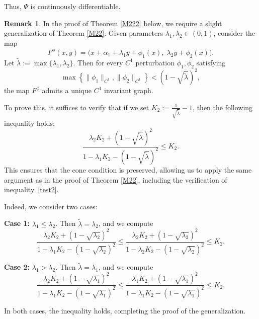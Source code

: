 \documentclass{amsart}
\theoremstyle{definition}
\newtheorem{Remark}[Definition]{Remark}
\begin{document}
Thus, $\Psi$ is continuously differentiable.

\begin{Remark}\label{needb}
In the proof of Theorem \ref{M222} below, we require a slight generalization of Theorem \ref{M22}. Given parameters $\lambda_1, \lambda_2 \in (0,1)$, consider the map
\begin{equation}\label{Fpwp}
F^\phi(x,y) = \big(x + \alpha_1 + \lambda_1 y + \phi_1(x),\; \lambda_2 y + \phi_2(x)\big).
\end{equation}
Let $\tilde{\lambda} := \max\{\lambda_1, \lambda_2\}$. Then for every $C^1$ perturbation $\phi_1, \phi_2$ satisfying
\[
\max\left\{\|\phi_1\|_{C^1},\|\phi_2\|_{C^1}\right\} < (1 - \sqrt{\tilde{\lambda}})^2,
\]
the map $F^\phi$ admits a unique $C^1$ invariant graph.

To prove this, it suffices to verify that if we set $K_2 := \frac{1}{\sqrt{\tilde{\lambda}}} - 1$, then the following inequality holds:
\[
\frac{\lambda_2 K_2 + (1 - \sqrt{\tilde{\lambda}})^2}{1 - \lambda_1 K_2 - (1 - \sqrt{\tilde{\lambda}})^2} \leq K_2.
\]
This ensures that the cone condition is preserved, allowing us to apply the same argument as in the proof of Theorem \ref{M22}, including the verification of inequality~\eqref{test2}.

Indeed, we consider two cases:

\medskip
\noindent\textbf{Case 1:} $\lambda_1 \leq \lambda_2$. Then $\tilde{\lambda} = \lambda_2$, and we compute
\[
\frac{\lambda_2 K_2 + (1 - \sqrt{\lambda_2})^2}{1 - \lambda_1 K_2 - (1 - \sqrt{\lambda_2})^2}
\leq \frac{\lambda_2 K_2 + (1 - \sqrt{\lambda_2})^2}{1 - \lambda_2 K_2 - (1 - \sqrt{\lambda_2})^2}
\leq K_2.
\]

\noindent\textbf{Case 2:} $\lambda_1 > \lambda_2$. Then $\tilde{\lambda} = \lambda_1$, and we compute
\[
\frac{\lambda_2 K_2 + (1 - \sqrt{\lambda_1})^2}{1 - \lambda_1 K_2 - (1 - \sqrt{\lambda_1})^2}
\leq \frac{\lambda_1 K_2 + (1 - \sqrt{\lambda_1})^2}{1 - \lambda_1 K_2 - (1 - \sqrt{\lambda_1})^2}
\leq K_2.
\]

In both cases, the inequality holds, completing the proof of the generalization.
\end{Remark}


 \vspace{2em}
\end{document}
